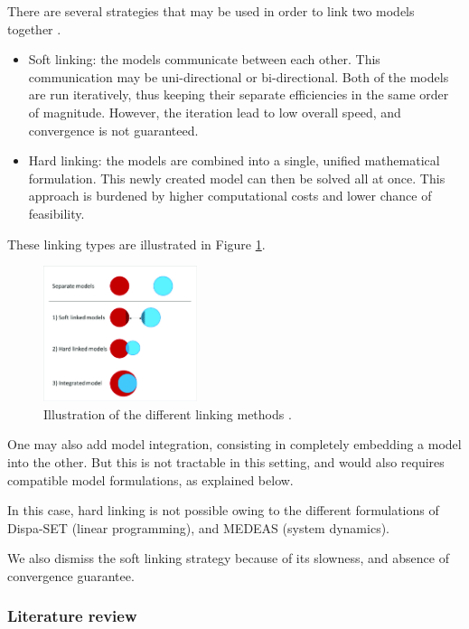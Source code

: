 There are several strategies that may be used in order to link two models together \cite{linkings-stuff}.

\begin{itemize}
    \item Soft linking: the models communicate between each other. This communication may be uni-directional or bi-directional. Both of the models are run iteratively, thus keeping their separate efficiencies in the same order of magnitude. However, the iteration lead to low overall speed, and convergence is not guaranteed.
    \item Hard linking: the models are combined into a single, unified mathematical formulation. This newly created model can then be solved all at once. This approach is burdened by higher computational costs and lower chance of feasibility.
\end{itemize}

These linking types are illustrated in Figure \ref{fig:linking-types}.

\begin{figure}[h]
    \centering
    \includegraphics[width=0.4\textwidth]{resources/images/hybrid_model_variants.png}
    \caption{Illustration of the different linking methods \cite{hybrid_models}.}
    \label{fig:linking-types}
\end{figure}

One may also add model integration, consisting in completely embedding a model into the other. But this is not tractable in this setting, and would also requires compatible model formulations, as explained below.

In this case, hard linking is not possible owing to the different formulations of Dispa-SET (linear programming), and MEDEAS (system dynamics).

We also dismiss the soft linking strategy because of its slowness, and absence of convergence guarantee.

\subsubsection{Literature review}

